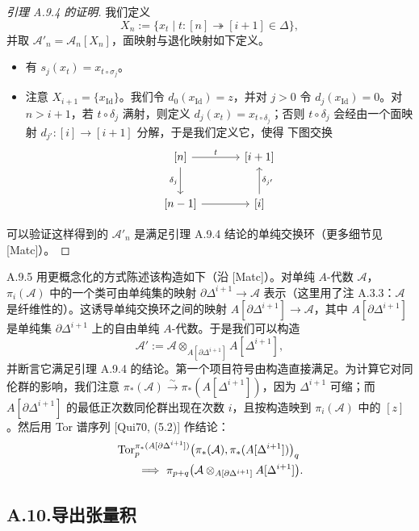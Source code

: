 \begin{proof}[引理 A.9.4 的证明]
我们定义
\[
X_n:=\{x_t\mid t\colon[n]\twoheadrightarrow[i+1]\in\Delta\},
\]
并取 $\mathcal A'_n=\mathcal A_n[X_n]$，面映射与退化映射如下定义。
\begin{itemize}
\item 有 $s_j(x_t)=x_{t\circ\sigma_j}$。
\item 注意 $X_{i+1}=\{x_{\mathrm{Id}}\}$。我们令 $d_0(x_{\mathrm{Id}})=z$，并对 $j>0$ 令 $d_j(x_{\mathrm{Id}})=0$。对 $n>i+1$，若 $t\circ\delta_j$ 满射，则定义 $d_j(x_t)=x_{t\circ\delta_j}$；否则 $t\circ\delta_j$ 会经由一个面映射 $d_{j'}\colon[i]\to[i+1]$ 分解，于是我们定义它，使得
下图交换
\[
\begin{tikzcd}[column sep=3.4em, row sep=2.4em]
{}[n] \arrow[r, "t"] \arrow[d, "{\delta_j}"'] & {}[i+1] \\
{}[n-1] \arrow[r] & {}[i] \arrow[u, "{\delta_{j'}}"']
\end{tikzcd}
\]
\end{itemize}
可以验证这样得到的 $\mathcal A'_n$ 是满足引理 A.9.4 结论的单纯交换环（更多细节见 [Matc]）。
\end{proof}

\begin{rem}{A.9.5}\label{thm:a6-07-18}
用更概念化的方式陈述该构造如下（沿 [Matc]）。对单纯 $A$-代数 $\mathcal A$，$\pi_i(\mathcal A)$ 中的一个类可由单纯集的映射 $\partial\Delta^{i+1}\to\mathcal A$ 表示（这里用了注 A.3.3：$\mathcal A$ 是纤维性的）。这诱导单纯交换环之间的映射 $A[\partial\Delta^{i+1}]\to\mathcal A$，其中 $A[\partial\Delta^{i+1}]$ 是单纯集 $\partial\Delta^{i+1}$ 上的自由单纯 $A$-代数。于是我们可以构造
\[
\mathcal A':=\mathcal A\otimes_{A[\partial\Delta^{i+1}]}A[\Delta^{i+1}],
\]
并断言它满足引理 A.9.4 的结论。第一个项目符号由构造直接满足。为计算它对同伦群的影响，我们注意 $\pi_*(\mathcal A)\xrightarrow{\sim}\pi_*(A[\Delta^{i+1}])$，因为 $\Delta^{i+1}$ 可缩；而 $A[\partial\Delta^{i+1}]$ 的最低正次数同伦群出现在次数 $i$，且按构造映到 $\pi_i(\mathcal A)$ 中的 $[z]$。然后用 Tor 谱序列 [Qui70, (5.2)] 作结论：
\[
\begin{aligned}
&\operatorname{Tor}^{\pi_*(A[\partial\Delta^{i+1}])}_p\bigl(\pi_*(\mathcal A),\pi_*(A[\Delta^{i+1}])\bigr)_q\\
&\qquad\Longrightarrow\ \pi_{p+q}\bigl(\mathcal A\otimes_{A[\partial\Delta^{i+1}]}A[\Delta^{i+1}]\bigr).
\end{aligned}
\]
\end{rem}

\subsection*{A.10.\quad 导出张量积}

